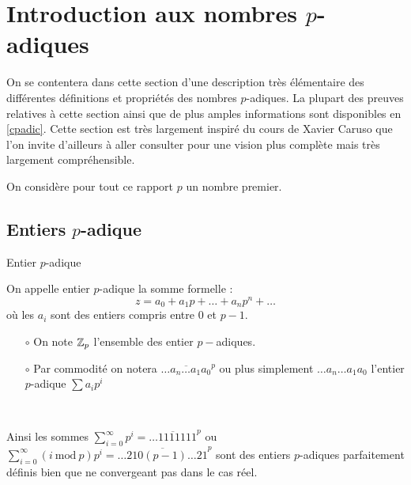 \section{Introduction aux nombres \texorpdfstring{$p$}{p}-adiques}
\label{padic}

On se contentera dans cette section d'une description très élémentaire des différentes définitions et propriétés des nombres $p$-adiques. La plupart des preuves relatives à cette section ainsi que de plus amples informations sont disponibles en \ref{cpadic}. Cette section est très largement inspiré du cours de Xavier Caruso \parencite{caruso_computations_2017} que l'on invite d'ailleurs à aller consulter pour une vision plus complète mais très largement compréhensible.

\begin{notation}
	On considère pour tout ce rapport $p$ un nombre premier.
\end{notation}

\subsection{Entiers \texorpdfstring{$p$}{p}-adique} 
\begin{definition}{Entier $p$-adique }

On appelle entier $p$-adique la somme formelle :
\[
	z  = a_0 + a_1 p + \ldots+a_{n}p^n+\ldots
\]
où les $a_i$ sont des entiers compris entre $0$ et $p-1$.

\end{definition}

\begin{remarques}
	\begin{itemize}
		\item[$\circ$]  On note $ \mathbb {Z}_p $ l'ensemble des entier $p-$adiques.
		\item[$\circ$] Par commodité on notera $\overline{\ldots a_n\ldots a_1 a_0}^p$ ou plus simplement $\ldots a_n \ldots a_1a_0$ l'entier $p$-adique $\sum a_{i}p^i$ 
\end{itemize}
\end{remarques}

\begin{ex} \

	Ainsi les sommes $\sum\limits_{i=0}^{ \infty} p^i = \overline{\ldots1111111}^p$ ou $\sum\limits_{i=0}^{ \infty} (i\ \text{mod}\ p) p^i =\overline{ \ldots210(p-1)\ldots21}^p $ sont des entiers $p$-adiques parfaitement définis bien que ne convergeant pas dans le cas réel. 
\end{ex}

